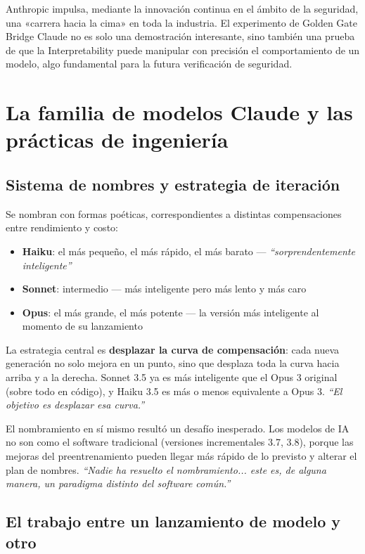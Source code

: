 \documentclass[a4paper]{article}
\begin{document}
Anthropic impulsa, mediante la innovación continua en el ámbito de la seguridad, una «carrera hacia la cima» en toda la industria. El experimento de Golden Gate Bridge Claude no es solo una demostración interesante, sino también una prueba de que la Interpretability puede manipular con precisión el comportamiento de un modelo, algo fundamental para la futura verificación de seguridad.

\section{La familia de modelos Claude y las prácticas de ingeniería}

\subsection{Sistema de nombres y estrategia de iteración}

Se nombran con formas poéticas, correspondientes a distintas compensaciones entre rendimiento y costo:
\begin{itemize}
    \item \textbf{Haiku}: el más pequeño, el más rápido, el más barato — \textit{``sorprendentemente inteligente''}
    \item \textbf{Sonnet}: intermedio — más inteligente pero más lento y más caro
    \item \textbf{Opus}: el más grande, el más potente — la versión más inteligente al momento de su lanzamiento
\end{itemize}

La estrategia central es \textbf{desplazar la curva de compensación}: cada nueva generación no solo mejora en un punto, sino que desplaza toda la curva hacia arriba y a la derecha. Sonnet 3.5 ya es más inteligente que el Opus 3 original (sobre todo en código), y Haiku 3.5 es más o menos equivalente a Opus 3. \textit{``El objetivo es desplazar esa curva.''}

El nombramiento en sí mismo resultó un desafío inesperado. Los modelos de IA no son como el software tradicional (versiones incrementales 3.7, 3.8), porque las mejoras del preentrenamiento pueden llegar más rápido de lo previsto y alterar el plan de nombres. \textit{``Nadie ha resuelto el nombramiento... este es, de alguna manera, un paradigma distinto del software común.''}

\subsection{El trabajo entre un lanzamiento de modelo y otro}
\end{document}
